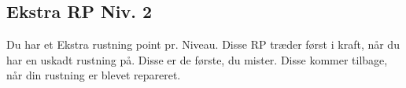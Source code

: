 \subsection*{Ekstra RP Niv. 2}
Du har et Ekstra rustning point pr. Niveau. Disse RP træder først i kraft, når du har en uskadt rustning på. Disse er de første, du mister. Disse kommer tilbage, når din rustning er blevet repareret.\\
